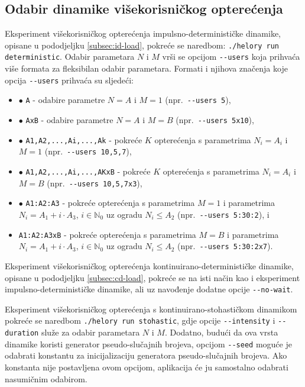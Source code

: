 \documentclass[times, utf8, diplomski]{fer}
\begin{document}
\subsection{Odabir dinamike višekorisničkog opterećenja}
Eksperiment višekorisničkog opterećenja impulsno-determinističke dinamike, opisane u pododjeljku \ref{subsec:id-load}, pokreće se naredbom: \lstinline{./helory run deterministic}. Odabir parametara $N$ i $M$ vrši se opcijom \lstinline{--users} koja prihvaća više formata za fleksibilan odabir parametara. Formati i njihova značenja koje opcija \lstinline{--users} prihvaća su sljedeći:
\begin{itemize}
    \item[$\bullet$] \lstinline{A} - odabire parametre $N = A$ i $M = 1$ (npr.\ \lstinline{--users 5}),
    \item[$\bullet$] \lstinline{AxB} - odabire parametre $N = A$ i $M = B$ (npr.\ \lstinline{--users 5x10}),
    \item[$\bullet$] \lstinline{A1,A2,...,Ai,...,Ak} - pokreće $K$ opterećenja s parametrima $N_i=A_i$ i $M=1$ (npr.\ \lstinline{--users 10,5,7}),
    \item[$\bullet$] \lstinline{A1,A2,...,Ai,...,AKxB} - pokreće $K$ opterećenja s parametrima $N_i=A_i$ i $M=B$ (npr.\ \lstinline{--users 10,5,7x3}),
    \item[$\bullet$] \lstinline{A1:A2:A3} - pokreće opterećenja s parametrima $M = 1$ i parametrima $N_i=A_1 + i \cdot A_3$, $i \in \mathbb{N}_0$ uz ogradu $N_i \leq A_2$ (npr.\ \lstinline{--users 5:30:2}), i
    \item[$\bullet$] \lstinline{A1:A2:A3xB} - pokreće opterećenja s parametrima $M = B$ i parametrima $N_i=A_1 + i \cdot A_3$, $i \in \mathbb{N}_0$ uz ogradu $N_i \leq A_2$ (npr.\ \lstinline{--users 5:30:2x7}).
\end{itemize}

Eksperiment višekorisničkog opterećenja kontinuirano-determinističke dinamike, opisane u pododjeljku \ref{subsec:cd-load}, pokreće se na isti način kao i eksperiment impulsno-determinističke dinamike, ali uz navođenje dodatne opcije \lstinline{--no-wait}.

Eksperiment višekorisničkog opterećenja s kontinuirano-stohastičkom dinamikom pokreće se naredbom \lstinline{./helory run stohastic}, gdje opcije \lstinline{--intensity} i \lstinline{--duration} služe za odabir parametara $N$ i $M$. Dodatno, budući da ova vrsta dinamike koristi generator pseudo-slučajnih brojeva, opcijom \lstinline{--seed} moguće je odabrati konstantu za inicijalizaciju generatora pseudo-slučajnih brojeva. Ako konstanta nije postavljena ovom opcijom, aplikacija će ju samostalno odabrati nasumičnim odabirom.
\end{document}
